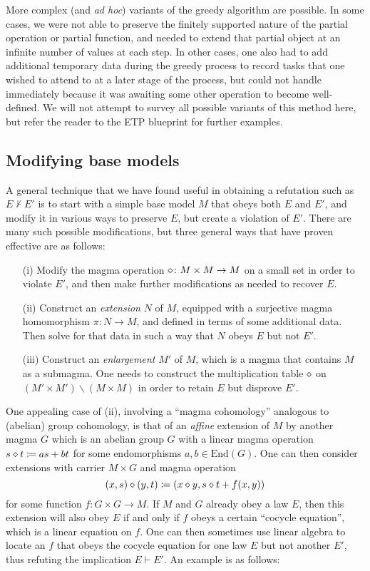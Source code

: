 More complex (and \emph{ad hoc}) variants of the greedy algorithm are possible.  In some cases, we were not able to preserve the finitely supported nature of the partial operation or partial function, and needed to extend that partial object at an infinite number of values at each step.  In other cases, one also had to add additional temporary data during the greedy process to record tasks that one wished to attend to at a later stage of the process, but could not handle immediately because it was awaiting some other operation to become well-defined.  We will not attempt to survey all possible variants of this method here, but refer the reader to the ETP blueprint for further examples.

\subsection{Modifying base models}\label{modify-base}

A general technique that we have found useful in obtaining a refutation such as $E \not \vdash E'$ is to start with a simple base model $M$ that obeys both $E$ and $E'$, and modify it in various ways to preserve $E$, but create a violation of $E'$.  There are many such possible modifications, but three general ways that have proven effective are as follows:

\begin{itemize}
  \item[(i)]  Modify the magma operation $\diamond \colon M \times M \to M$ on a small set in order to violate $E'$, and then make further modifications as needed to recover $E$.
  \item[(ii)]  Construct an \emph{extension} $N$ of $M$, equipped with a surjective magma homomorphism $\pi: N \to M$, and defined in terms of some additional data.  Then solve for that data in such a way that $N$ obeys $E$ but not $E'$.
  \item[(iii)]  Construct an \emph{enlargement} $M'$ of $M$, which is a magma that contains $M$ as a submagma.  One needs to construct the multiplication table $\diamond$ on $(M' \times M') \backslash (M \times M)$ in order to retain $E$ but disprove $E'$.
\end{itemize}

One appealing case of (ii), involving a ``magma cohomology'' analogous to (abelian) group cohomology, is that of an \emph{affine} extension of $M$ by another magma $G$ which is an abelian group $G$ with a linear magma operation $s \diamond t \coloneqq as + bt$ for some endomorphisms $a,b \in \mathrm{End}(G)$.  One can then consider extensions with carrier $M \times G$ and magma operation
\begin{equation}\label{xsyt}
 (x, s) \diamond (y, t) \coloneqq (x \diamond y, s \diamond t + f(x,y))
\end{equation}
for some function $f \colon G \times G \to M$.  If $M$ and $G$ already obey a law $E$, then this extension will also obey $E$ if and only if $f$ obeys a certain ``cocycle equation'', which is a linear equation on $f$.  One can then sometimes use linear algebra to locate an $f$ that obeys the cocycle equation for one law $E$ but not another $E'$, thus refuting the implication $E \vdash E'$.  An example is as follows:

